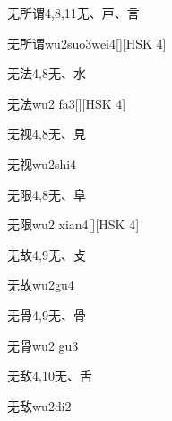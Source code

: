 \begin{entry}{无所谓}{4,8,11}{⽆、⼾、⾔}
  \begin{phonetics}{无所谓}{wu2suo3wei4}[][HSK 4]
  \end{phonetics}
\end{entry}

\begin{entry}{无法}{4,8}{⽆、⽔}
  \begin{phonetics}{无法}{wu2 fa3}[][HSK 4]
  \end{phonetics}
\end{entry}

\begin{entry}{无视}{4,8}{⽆、⾒}
  \begin{phonetics}{无视}{wu2shi4}
  \end{phonetics}
\end{entry}

\begin{entry}{无限}{4,8}{⽆、⾩}
  \begin{phonetics}{无限}{wu2 xian4}[][HSK 4]
  \end{phonetics}
\end{entry}

\begin{entry}{无故}{4,9}{⽆、⽁}
  \begin{phonetics}{无故}{wu2gu4}
  \end{phonetics}
\end{entry}

\begin{entry}{无骨}{4,9}{⽆、⾻}
  \begin{phonetics}{无骨}{wu2 gu3}
  \end{phonetics}
\end{entry}

\begin{entry}{无敌}{4,10}{⽆、⾆}
  \begin{phonetics}{无敌}{wu2di2}
  \end{phonetics}
\end{entry}

